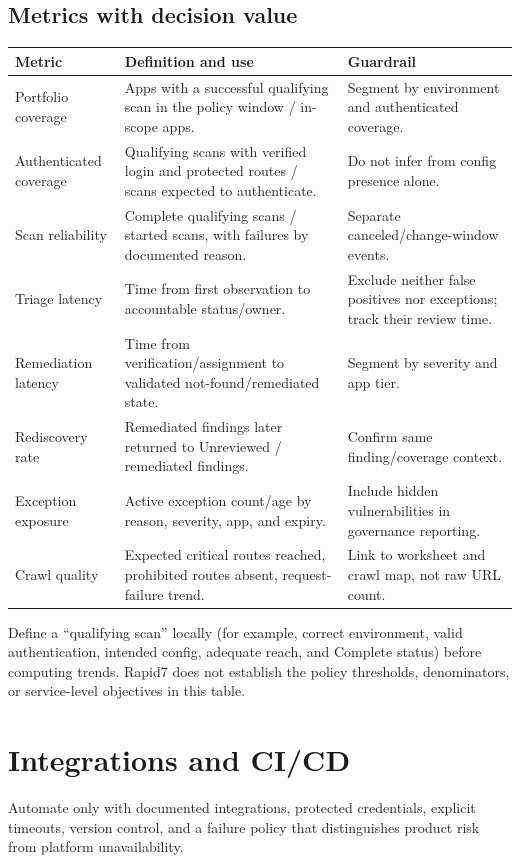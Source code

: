 \documentclass[11pt,letterpaper,oneside]{scrreprt}
\newcommand{\chapterlead}[1]{\begin{tcolorbox}[enhanced,colback=R7Light,colframe=R7Light,boxrule=0pt,borderline west={3pt}{0pt}{R7Orange},arc=0pt,left=9pt,right=9pt,top=7pt,bottom=7pt]#1\end{tcolorbox}}
\begin{document}
\section{Metrics with decision value}
\begin{tabularx}{\textwidth}{@{}P{1.8in}Y P{1.75in}@{}}
\toprule
\textbf{Metric} & \textbf{Definition and use} & \textbf{Guardrail}\\
\midrule
Portfolio coverage & Apps with a successful qualifying scan in the policy window / in-scope apps. & Segment by environment and authenticated coverage.\\
Authenticated coverage & Qualifying scans with verified login and protected routes / scans expected to authenticate. & Do not infer from config presence alone.\\
Scan reliability & Complete qualifying scans / started scans, with failures by documented reason. & Separate canceled/change-window events.\\
Triage latency & Time from first observation to accountable status/owner. & Exclude neither false positives nor exceptions; track their review time.\\
Remediation latency & Time from verification/assignment to validated not-found/remediated state. & Segment by severity and app tier.\\
Rediscovery rate & Remediated findings later returned to Unreviewed / remediated findings. & Confirm same finding/coverage context.\\
Exception exposure & Active exception count/age by reason, severity, app, and expiry. & Include hidden vulnerabilities in governance reporting.\\
Crawl quality & Expected critical routes reached, prohibited routes absent, request-failure trend. & Link to worksheet and crawl map, not raw URL count.\\
\bottomrule
\end{tabularx}

\begin{oprec}
Define a ``qualifying scan'' locally (for example, correct environment, valid authentication, intended config, adequate reach, and Complete status) before computing trends. Rapid7 does not establish the policy thresholds, denominators, or service-level objectives in this table.
\end{oprec}

\chapter{Integrations and CI/CD}
\chapterlead{Automate only with documented integrations, protected credentials, explicit timeouts, version control, and a failure policy that distinguishes product risk from platform unavailability.}
\end{document}
